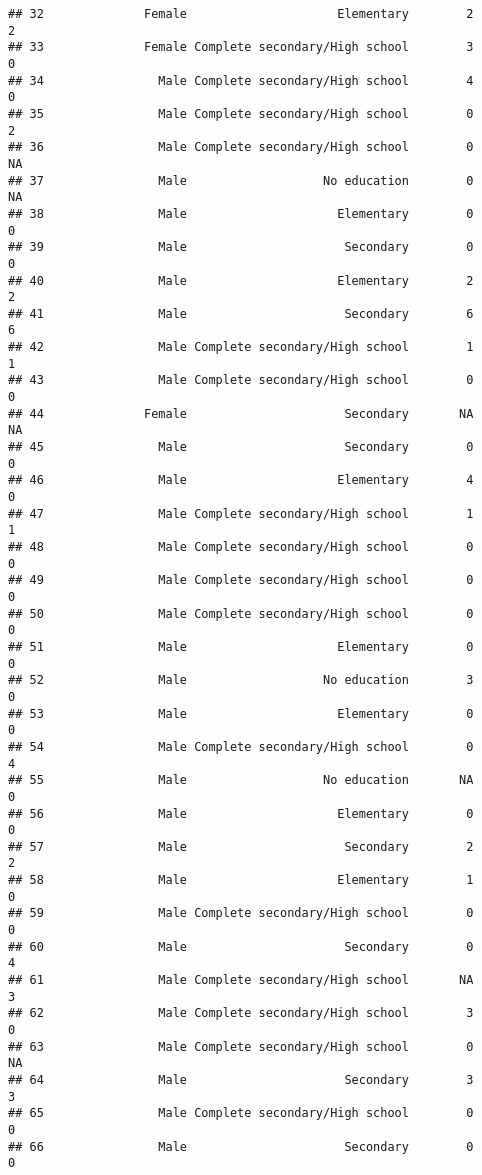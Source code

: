\documentclass[
]{article}
\begin{document}
\begin{verbatim}
## 32              Female                     Elementary        2        2
## 33              Female Complete secondary/High school        3        0
## 34                Male Complete secondary/High school        4        0
## 35                Male Complete secondary/High school        0        2
## 36                Male Complete secondary/High school        0       NA
## 37                Male                   No education        0       NA
## 38                Male                     Elementary        0        0
## 39                Male                      Secondary        0        0
## 40                Male                     Elementary        2        2
## 41                Male                      Secondary        6        6
## 42                Male Complete secondary/High school        1        1
## 43                Male Complete secondary/High school        0        0
## 44              Female                      Secondary       NA       NA
## 45                Male                      Secondary        0        0
## 46                Male                     Elementary        4        0
## 47                Male Complete secondary/High school        1        1
## 48                Male Complete secondary/High school        0        0
## 49                Male Complete secondary/High school        0        0
## 50                Male Complete secondary/High school        0        0
## 51                Male                     Elementary        0        0
## 52                Male                   No education        3        0
## 53                Male                     Elementary        0        0
## 54                Male Complete secondary/High school        0        4
## 55                Male                   No education       NA        0
## 56                Male                     Elementary        0        0
## 57                Male                      Secondary        2        2
## 58                Male                     Elementary        1        0
## 59                Male Complete secondary/High school        0        0
## 60                Male                      Secondary        0        4
## 61                Male Complete secondary/High school       NA        3
## 62                Male Complete secondary/High school        3        0
## 63                Male Complete secondary/High school        0       NA
## 64                Male                      Secondary        3        3
## 65                Male Complete secondary/High school        0        0
## 66                Male                      Secondary        0        0

\end{verbatim}
\end{document}
